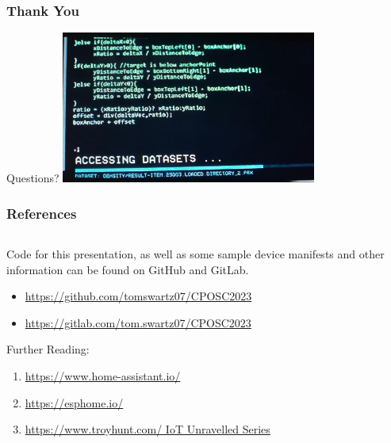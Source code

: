 \documentclass[aspectratio=169]{beamer}
\begin{document}
\begin{frame}
  \frametitle{Thank You}
  \begin{center}
    \LARGE{Questions?}
    \vfill
    \includegraphics[height=5cm]{images/lol-code.jpg}
  \end{center}
\end{frame}
\begin{frame}
  \frametitle{References}
  \begin{columns}[]
    \begin{column}[T]{0.55\paperwidth}
      Code for this presentation, as well as some sample device manifests and other
      information can be found on GitHub and GitLab.
      \begin{itemize}
        \item{\href{https://github.com/tomswartz07/CPOSC2023}{https://github.com/tomswartz07/CPOSC2023}}
        \item{\href{https://gitlab.com/tom.swartz07/CPOSC2023}{https://gitlab.com/tom.swartz07/CPOSC2023}}
      \end{itemize}
      \vfill
      Further Reading:
      \begin{enumerate}
        \item{\href{https://www.home-assistant.io/}{https://www.home-assistant.io/}}
        \item{\href{https://esphome.io/}{https://esphome.io/}}
        \item{\href{https://www.troyhunt.com/iot-unravelled-part-1-its-a-mess-but-then-theres-home-assistant/}{https://www.troyhunt.com/ IoT Unravelled Series}}
      \end{enumerate}
    \end{column}
    \begin{column}[T]{0.35\paperwidth}
    \end{column}
  \end{columns}
\end{frame}
\end{document}

